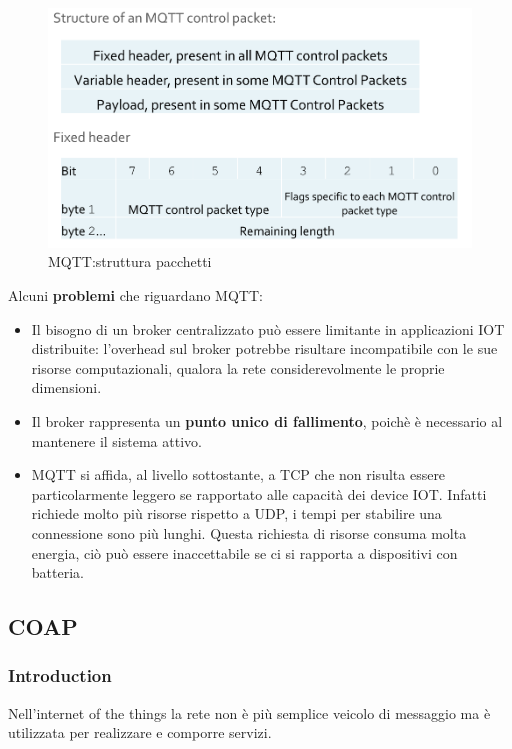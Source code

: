 \documentclass[12pt]{article}
\begin{document}
    		\begin{figure}[h!]
    			\centering
    			\includegraphics[scale=0.3]{img/packet.png}
    			\caption{MQTT:struttura pacchetti}
    		\end{figure}
    		Alcuni\textbf{ problemi} che riguardano MQTT:
    		\begin{itemize}
    			\item Il bisogno di un broker centralizzato può essere limitante in applicazioni IOT distribuite: l'overhead sul broker potrebbe risultare incompatibile con le sue risorse computazionali, qualora la rete considerevolmente le proprie dimensioni.
    			\item Il broker rappresenta un \textbf{punto unico di fallimento}, poichè è necessario al mantenere il sistema attivo. 
    			\item MQTT si affida, al livello sottostante, a TCP che non risulta essere particolarmente leggero se rapportato alle capacità dei device IOT. Infatti richiede molto più risorse rispetto a UDP, i tempi per stabilire una connessione sono più lunghi. Questa richiesta di risorse consuma molta energia, ciò può essere inaccettabile se ci si rapporta a dispositivi con batteria.    
    		\end{itemize}
    \subsection{COAP}
    	\subsubsection{Introduction}
    		Nell'internet of the things la rete non è più semplice veicolo di messaggio ma è utilizzata per realizzare e comporre servizi.
    		
\end{document}

